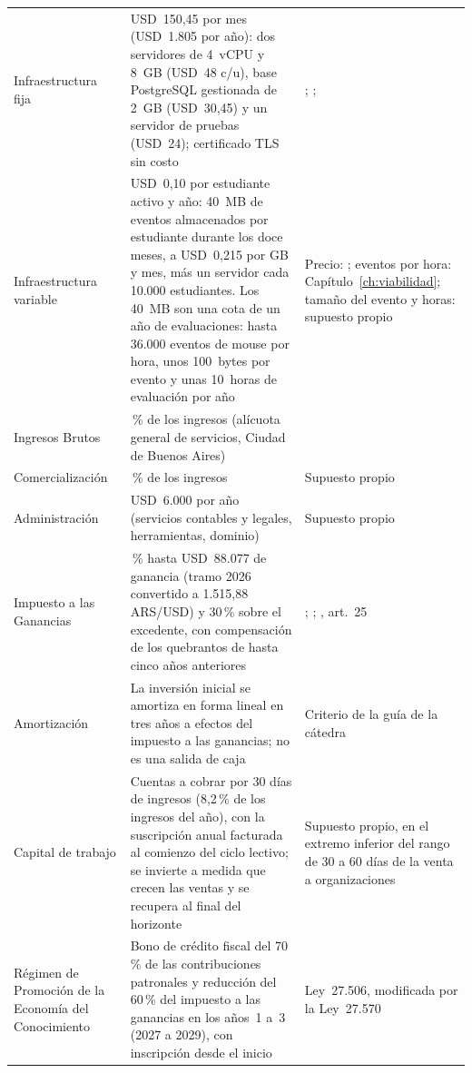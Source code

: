 {\begin{longtable}{>{\raggedright\arraybackslash}p{3.6cm} >{\raggedright\arraybackslash}p{6.6cm} >{\raggedright\arraybackslash}p{4.1cm}}
    Infraestructura fija & USD~150,45 por mes (USD~1.805 por año): dos servidores de 4~vCPU y 8~GB (USD~48 c/u), base PostgreSQL gestionada de 2~GB (USD~30,45) y un servidor de pruebas (USD~24); certificado TLS sin costo & \textcite{DigitalOcean2026Droplets}; \textcite{DigitalOcean2026DB}; \textcite{LetsEncrypt} \\
    Infraestructura variable & USD~0,10 por estudiante activo y año: 40~MB de eventos almacenados por estudiante durante los doce meses, a USD~0,215 por GB y mes, más un servidor cada 10.000 estudiantes. Los 40~MB son una cota de un año de evaluaciones: hasta 36.000 eventos de mouse por hora, unos 100~bytes por evento y unas 10~horas de evaluación por año & Precio: \textcite{DigitalOcean2026DB}; eventos por hora: Capítulo~\ref{ch:viabilidad}; tamaño del evento y horas: supuesto propio \\
    Ingresos Brutos & 3\,\% de los ingresos (alícuota general de servicios, Ciudad de Buenos Aires) & \textcite{BDO2025TarifariaCABA} \\
    Comercialización & 10\,\% de los ingresos & Supuesto propio \\
    Administración & USD~6.000 por año (servicios contables y legales, herramientas, dominio) & Supuesto propio \\
    Impuesto a las Ganancias & 25\,\% hasta USD~88.077 de ganancia (tramo 2026 convertido a 1.515,88 ARS/USD) y 30\,\% sobre el excedente, con compensación de los quebrantos de hasta cinco años anteriores & \textcite{ARCA2026EscalaPJ}; \textcite{BCRA2026TCRef}; \textcite{Argentina2019LIG}, art.~25 \\
    Amortización & La inversión inicial se amortiza en forma lineal en tres años a efectos del impuesto a las ganancias; no es una salida de caja & Criterio de la guía de la cátedra~\parencite{UADE2026ModeloNegocio} \\
    Capital de trabajo & Cuentas a cobrar por 30 días de ingresos (8,2\,\% de los ingresos del año), con la suscripción anual facturada al comienzo del ciclo lectivo; se invierte a medida que crecen las ventas y se recupera al final del horizonte & Supuesto propio, en el extremo inferior del rango de 30 a 60 días de la venta a organizaciones~\parencite{UADE2026ModeloNegocio} \\
    Régimen de Promoción de la Economía del Conocimiento & Bono de crédito fiscal del 70\,\% de las contribuciones patronales y reducción del 60\,\% del impuesto a las ganancias en los años~1 a~3 (2027 a 2029), con inscripción desde el inicio & Ley~27.506, modificada por la Ley~27.570~\parencite{Argentina2020Ley27570} \\

\end{longtable}}
